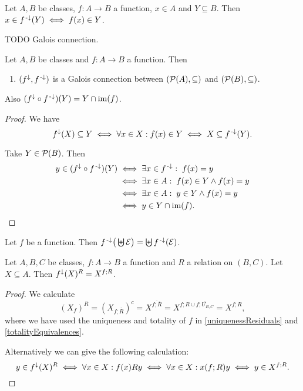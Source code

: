 \begin{lemma}
Let $A,B$ be classes, $f:A\to B$ a function, $x\in A$ and $Y\subseteq B$. Then $x\in f^{\text{\hspace{0.15em}-}\downarrow}(Y) \iff f(x)\in Y$.
\end{lemma}
TODO Galois connection.

\begin{proposition}
Let $A,B$ be classes and $f:A\to B$ a function. Then
\begin{enumerate}
\item $(f^\downarrow,f^{\text{\hspace{0.15em}-}\downarrow})$ is a Galois connection between $\left( \operatorname{\mathcal{P}}(A), \subseteq \right)$ and $\left( \operatorname{\mathcal{P}}(B), \subseteq \right)$.
\end{enumerate}
Also $(f^\downarrow\circ f^{{\text{\hspace{0.15em}-}\downarrow}})(Y) = Y\cap \operatorname{im}(f)$.
\end{proposition}
\begin{proof}
We have
\[ f^\downarrow(X) \subseteq Y \iff \forall x\in X: f(x) \in Y \iff X \subseteq f^{{\text{\hspace{0.15em}-}\downarrow}}(Y). \]

Take $Y\in \operatorname{\mathcal{P}}(B)$. Then
\begin{align*}
y\in (f^\downarrow\circ f^{{\text{\hspace{0.15em}-}\downarrow}})(Y) &\iff \exists x\in f^{{\text{\hspace{0.15em}-}\downarrow}}:\; f(x) = y \\
&\iff \exists x\in A: \;f(x)\in Y \land f(x) = y \\
&\iff \exists x\in A: \;y \in Y \land f(x) = y \\
&\iff y\in Y\cap \operatorname{im}(f).
\end{align*}
\end{proof}





\begin{lemma}
Let $f$ be a function. Then $f^{{\text{\hspace{0.15em}-}\downarrow}}\big(\biguplus \mathcal{E}\big) = \biguplus f^{\text{\hspace{0.15em}-}\downarrow}(\mathcal{E})$.
\end{lemma}

\begin{lemma} \label{functionUpperbound}
Let $A,B,C$ be classes, $f: A\to B$ a function and $R$ a relation on $(B,C)$. Let $X \subseteq A$. Then $f^\downarrow(X)^R = X^{f;R}$.
\end{lemma}
\begin{proof}
We calculate
\[ (X_f)^{R} = (X_{f;\overline{R}})^c = X^{\overline{f;\overline{R}}} = X^{f;R \cup \overline{f;U_{B,C}}} = X^{f;R}, \]
where we have used the uniqueness and totality of $f$ in \ref{uniquenessResiduals} and \ref{totalityEquivalences}.

Alternatively we can give the following calculation:
\[ y\in f^\downarrow(X)^R \iff \forall x\in X: f(x)Ry \iff \forall x\in X: x(f;R)y \iff y\in X^{f;R}. \]
\end{proof}

